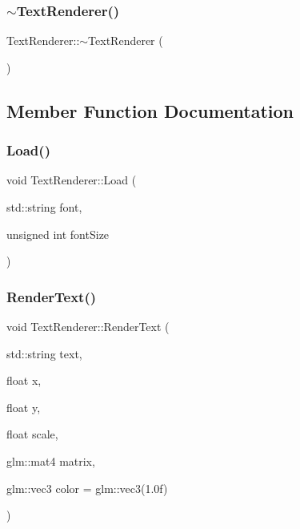 \subsubsection{\texorpdfstring{$\sim$\+Text\+Renderer()}{~TextRenderer()}}
{\footnotesize\ttfamily Text\+Renderer\+::$\sim$\+Text\+Renderer (\begin{DoxyParamCaption}{ }\end{DoxyParamCaption})\hspace{0.3cm}{\ttfamily [inline]}}



\subsection{Member Function Documentation}
\mbox{\label{classTextRenderer_addf75e2c1eede12f9fcc465e83cec2d9}} 
\subsubsection{\texorpdfstring{Load()}{Load()}}
{\footnotesize\ttfamily void Text\+Renderer\+::\+Load (\begin{DoxyParamCaption}\item[{std\+::string}]{font,  }\item[{unsigned int}]{font\+Size }\end{DoxyParamCaption})}

\mbox{\label{classTextRenderer_a2a206340f4c1c250bd79ebe3c7362135}} 
\subsubsection{\texorpdfstring{Render\+Text()}{RenderText()}}
{\footnotesize\ttfamily void Text\+Renderer\+::\+Render\+Text (\begin{DoxyParamCaption}\item[{std\+::string}]{text,  }\item[{float}]{x,  }\item[{float}]{y,  }\item[{float}]{scale,  }\item[{glm\+::mat4}]{matrix,  }\item[{glm\+::vec3}]{color = {\ttfamily glm\+:\+:vec3(1.0f)} }\end{DoxyParamCaption})}



